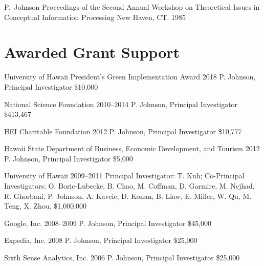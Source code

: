 \documentclass[11pt,letterpaper,sans]{moderncv} %
\begin{document}
          {P.~Johnson}
          {Proceedings of the Second Annual Workshop on Theoretical Issues in Conceptual Information Processing}
          {New Haven, CT.  1985}

\section{Awarded Grant Support}

        {University of Hawaii President's Green Implementation Award} %
        {2018} %
        {P. Johnson, Principal Investigator}  %
        {\$10,000} %

        {National Science Foundation} %
        {2010--2014} %
        {P. Johnson, Principal Investigator}  %
        {\$413,467} %

            {HEI Charitable Foundation}
            {2012}
            {P. Johnson, Principal Investigator} 
            {\$10,777}

            {Hawaii State Department of Business, Economic Development, and Tourism} %
            {2012} %
            {P. Johnson, Principal Investigator}  %
            {\$5,000} %

        {University of Hawaii} %
        {2009--2011} %
        {Principal Investigator: T. Kuh; Co-Principal Investigators:  O. Boric-Lubecke, B. Chao, M. Coffman, D. Garmire, M. Nejhad, R. Ghorbani, P. Johnson, A. Kavcic, D. Konan, B. Liaw, E. Miller, W. Qu, M. Teng, X. Zhou.}  %
        {\$1,000,000} %

        {Google, Inc.} %
        {2008--2009} %
        {P. Johnson, Principal Investigator}  %
        {\$45,000} %

        {Expedia, Inc.} %
        {2008} %
        {P. Johnson, Principal Investigator}  %
        {\$25,000} %

        {Sixth Sense Analytics, Inc.} %
        {2006} %
        {P. Johnson, Principal Investigator}  %
        {\$25,000} %
\end{document}
